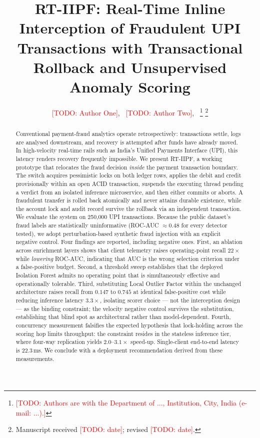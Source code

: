 \documentclass[journal]{IEEEtran}
\newcommand{\todo}[1]{\textcolor{red}{[TODO: #1]}}
\begin{document}
\title{RT-IIPF: Real-Time Inline Interception of Fraudulent UPI Transactions
with Transactional Rollback and Unsupervised Anomaly Scoring}

\author{\todo{Author One},~
        \todo{Author Two},~
\thanks{\todo{Authors are with the Department of ..., Institution, City,
India (e-mail: ...).}}
\thanks{Manuscript received \todo{date}; revised \todo{date}.}}

\maketitle

\begin{abstract}
Conventional payment-fraud analytics operate retrospectively: transactions
settle, logs are analysed downstream, and recovery is attempted after funds
have already moved. In high-velocity real-time rails such as India's Unified
Payments Interface (UPI), this latency renders recovery frequently
impossible. We present RT-IIPF, a working prototype that relocates the fraud
decision \emph{inside} the payment transaction boundary. The switch acquires
pessimistic locks on both ledger rows, applies the debit and credit
provisionally within an open ACID transaction, suspends the executing thread
pending a verdict from an isolated inference microservice, and then either
commits or aborts. A fraudulent transfer is rolled back atomically and never
attains durable existence, while the account lock and audit record survive
the rollback via an independent transaction. We evaluate the system on
250{,}000 UPI transactions. Because the public dataset's fraud labels are
statistically uninformative (ROC-AUC $\approx 0.48$ for every detector
tested), we adopt perturbation-based synthetic fraud injection with an
explicit negative control. Four findings are reported, including negative
ones. First, an ablation across enrichment layers shows that client
telemetry raises operating-point recall $22\times$ while \emph{lowering}
ROC-AUC, indicating that AUC is the wrong selection criterion under a
false-positive budget. Second, a threshold sweep establishes that the
deployed Isolation Forest admits no operating point that is simultaneously
effective and operationally tolerable. Third, substituting Local Outlier
Factor within the unchanged architecture raises recall from $0.147$ to
$0.745$ at identical false-positive cost while reducing inference latency
$3.3\times$, isolating scorer choice --- not the interception design --- as
the binding constraint; the velocity negative control survives the
substitution, establishing that blind spot as architectural rather than
model-dependent. Fourth, concurrency measurement falsifies the expected
hypothesis that lock-holding across the scoring hop limits throughput: the
constraint resides in the stateless inference tier, where four-way
replication yields $2.0$--$3.1\times$ speed-up. Single-client end-to-end
latency is $22.3$\,ms. We conclude with a deployment recommendation derived
from these measurements.
\end{abstract}
\end{document}
